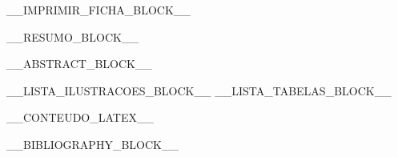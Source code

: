 \documentclass[
    12pt,
    a4paper,
    twoside
]{abntex2}
\begin{document}
\imprimircapa
\imprimirfolhaderosto
__IMPRIMIR_FICHA_BLOCK__
\cleardoublepage

__RESUMO_BLOCK__

__ABSTRACT_BLOCK__

__LISTA_ILUSTRACOES_BLOCK__
__LISTA_TABELAS_BLOCK__
\tableofcontents
\cleardoublepage

__CONTEUDO_LATEX__

\cleardoublepage
__BIBLIOGRAPHY_BLOCK__
\end{document}
